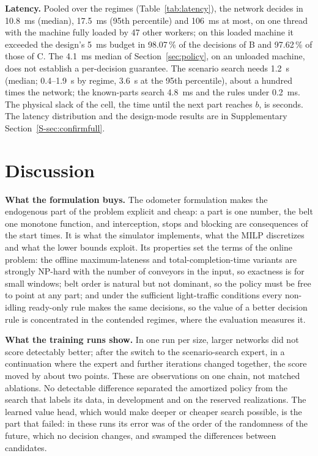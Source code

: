 \documentclass[11pt,a4paper]{article}
\theoremstyle{plain}
\theoremstyle{definition}
\theoremstyle{remark}
\newcommand{\Supp}[1]{Supplementary Section~\ref{S-#1}}
\begin{document}
\begin{table}[t]
\centering\small
\caption{Per-decision latency of every policy on the same decisions (one thread, machine
fully loaded), pooled over the eight regimes: 16\,215 decisions in B, 17\,147 in C (seeds
7000--7029, shared with the companion paper).}
\label{tab:latency}
\resizebox{0.85\linewidth}{!}{}
\end{table}

\textbf{Latency.} Pooled over the regimes (Table~\ref{tab:latency}), the network decides in
10.8~ms (median), 17.5~ms (95th percentile) and 106~ms at most, on one thread with the
machine fully loaded by 47 other workers; on this loaded machine it exceeded the design's
5~ms budget in 98.07\,\% of the decisions of B and 97.62\,\% of those of C. The 4.1~ms median
of Section~\ref{sec:policy}, on an unloaded machine, does not establish a per-decision
guarantee. The scenario search needs 1.2~s (median; 0.4--1.9~s by regime, 3.6~s at the 95th
percentile), about a hundred times the network; the known-parts search 4.8~ms and the rules
under 0.2~ms. The physical slack of the cell, the time until the next part reaches $b$, is
seconds. The latency distribution and the design-mode results are in
\Supp{sec:confirmfull}.

\section{Discussion}\label{sec:discussion}
\textbf{What the formulation buys.} The odometer formulation makes the endogenous part of
the problem explicit and cheap: a part is one number, the belt one monotone function, and
interception, stops and blocking are consequences of the start times. It is what the
simulator implements, what the MILP discretizes and what the lower bounds exploit. Its
properties set the terms of the online problem: the offline maximum-lateness and
total-completion-time variants are strongly NP-hard with the number of conveyors in the
input, so exactness is for small windows; belt order is natural but not dominant, so the
policy must be free to point at any part; and under the sufficient light-traffic conditions
every non-idling ready-only rule makes the same decisions, so the value of a better
decision rule is concentrated in the contended regimes, where the evaluation measures it.

\textbf{What the training runs show.} In one run per size, larger networks did not score
detectably better; after the switch to the scenario-search expert, in a continuation where
the expert and further iterations changed together, the score moved by about two points.
These are observations on one chain, not matched ablations. No detectable difference
separated the amortized policy from the search that labels its data, in development and on
the reserved realizations. The learned value head, which would make deeper or cheaper search
possible, is the part that failed: in these runs its error was of the order of the
randomness of the future, which no decision changes, and swamped the differences between
candidates.
\end{document}
